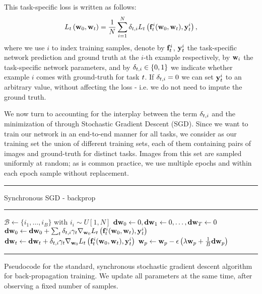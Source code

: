 \documentclass[10pt,twocolumn,letterpaper]{article}
\begin{document}
This task-specific loss  is written as follows:
\begin{gather}
L_{t}\left(\mathbf{w}_{0},\mathbf{w}_{t}\right) = \frac{1}{N}\sum_{i=1}^{N}  \delta_{t,i} L_{t}\left(\mathbf{f}^{i}_{t}(\mathbf{w}_{0},\mathbf{w}_{t}),\mathbf{y}^{i}_{t}\right),
\end{gather}
where we use $i$ to index training samples, denote by $\mathbf{f}^{i}_{t}$,
$\mathbf{y}^{i}_{t}$  the task-specific network prediction and ground truth at the $i$-th example respectively, by $\mathbf{w}_{i}$ the task-specific network parameters, and by $\delta_{t,i} \in \{0,1\}$ we indicate whether  example $i$ comes with ground-truth for  task $t$.
If $\delta_{t,i}=0$ we can set $\mathbf{y}^{i}_{t}$ to an arbitrary value, without affecting the loss - i.e. we do not need to impute the ground truth. 

We now turn to accounting for  the interplay  between the term $\delta_{t,i}$ and the minimization of 
through Stochastic Gradient Descent (SGD). Since we want to train our network in an end-to-end manner for all tasks, we consider as our training set the union of different training sets, each of them containing pairs of images and ground-truth for distinct tasks. Images from this set are sampled uniformly at random; as is common practice, we  use multiple epochs and within each epoch sample without replacement. 



\newcommand{\bi}{i}
\newcommand{\bs}{B}
\newcommand{\mb}{\mathcal{B}}
\newcommand{\tast}{p}

 \newcommand{\grad}[1]{{\mathrm{\mathbf{d}}#1}}
 \newcommand{\cnt}[1]{\mathrm{\mathbf{c}}_{#1}}
 \newcommand{\setto}{\leftarrow}
 \begin{table}[!t]
 	\hrule
 	\vspace{3pt}
 	Synchronous SGD - backprop
 	\hrule
 	\begin{algorithmic}
 		\STATE {}
 		\STATE  $\mb \setto \{\bi_1,\ldots,\bi_{\bs}\}$ with $\bi_i \sim U[1,N]$ 
 		\STATE {}
 		\STATE $\grad{\prm{\cnn}} \setto 0,\grad{\prm{1}} \setto 0,\ldots,\grad{\prm{T}} \setto 0$  
 		\FOR{$\bi \in \mb$}
 		\STATE {}
 		\STATE $ \grad{\prm{\cnn}} \setto \grad{\prm{\cnn}} + \sum_{\task} \mydelta{\task}{\bi}\gamma_{\task}\lossdd{\task}{\prd{\task}{\bi}(\prm{\cnn},\prm{\task})}{\gt{\task}{\bi}}{\prm{\cnn}}$
 		\STATE {}
 		\STATE $ \grad{\prm{\task}} \setto \grad{\prm{\task}} + \mydelta{\task}{\bi}\gamma_{\task}\lossdd{\task}{\prd{\task}{\bi}(\prm{\cnn},\prm{\task})}{\gt{\task}{\bi}}{\prm{\cnn}}$ 
 		\ENDFOR
 		\FOR{$\tast \in \{\cnn,1,\ldots,T\}$}
 		\STATE $\prm{\tast} \setto \prm{\tast} - \epsilon\left( \lambda  \prm{\tast}   + \frac{1}{\bs}\grad{\prm{\tast}} \right)$
 		\ENDFOR
 		\ENDFOR
 		\vspace{.2cm}
 		\hrule
 	\end{algorithmic}
 	\caption{Pseudocode for the standard, synchronous stochastic gradient descent algorithm for back-propagation training. We update all parameters at the same time, after observing a fixed number of samples. \label{sync}}
 \end{table}
 
\end{document}
